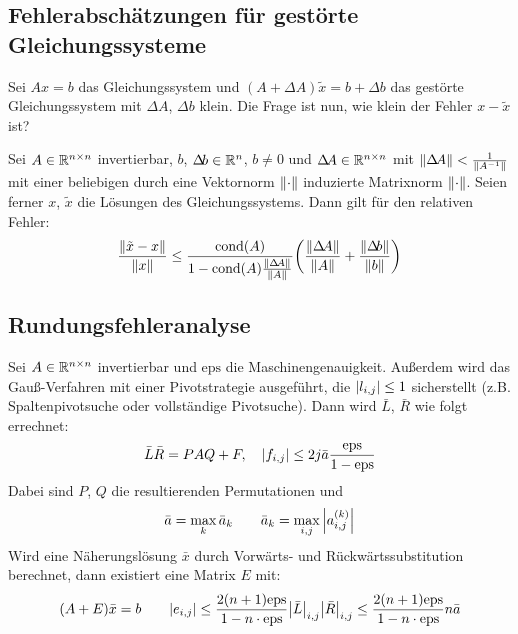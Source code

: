         \subsection{Fehlerabschätzungen für gestörte Gleichungssysteme}
            Sei \( Ax = b \) das Gleichungssystem und \( (A + \Delta\!A)\tilde{x} = b + \Delta\!b \) das gestörte Gleichungssystem mit \( \Delta\!A \), \( \Delta\!b \) klein. Die Frage ist nun, wie klein der Fehler \( x - \tilde{x} \) ist?
            
            Sei \( A \in \mathbb{R}^{n \times n} \) invertierbar, \(b\), \(\Delta\!b \in \mathbb{R}^n\), \(b \neq 0\) und \(\Delta\!A \in \mathbb{R}^{n \times n}\) mit \( \norm{\Delta\!A} < \frac{1}{\norm{A^{-1}}} \) mit einer beliebigen durch eine Vektornorm \( \norm{\cdot} \) induzierte Matrixnorm \( \norm{\cdot} \). Seien ferner \(x\), \(\tilde{x}\) die Lösungen des Gleichungssystems. Dann gilt für den relativen Fehler:
            \begin{equation*}
	            \frac{\norm{\tilde{x} - x}}{\norm{x}} \leq \frac{\operatorname{cond}(A)}{1 - \operatorname{cond}(A) \frac{\norm{\Delta\!A}}{\norm{A}}} \bigg( \frac{\norm{\Delta\!A}}{\norm{A}} + \frac{\norm{\Delta\!b}}{\norm{b}} \bigg)
            \end{equation*}

        \subsection{Rundungsfehleranalyse}
            Sei \( A \in \mathbb{R}^{n \times n} \) invertierbar und \( \textrm{eps} \) die Maschinengenauigkeit. Außerdem wird das Gauß-Verfahren mit einer Pivotstrategie ausgeführt, die \( \abs{l_{i,j}} \leq 1 \) sicherstellt (z.B. Spaltenpivotsuche oder vollständige Pivotsuche). Dann wird \( \bar{L} \), \( \bar{R} \) wie folgt errechnet:
            \begin{equation*}
	            \bar{L}\bar{R} = PAQ + F, \quad \abs{f_{i,j}} \leq 2 j \bar{a} \frac{\textrm{eps}}{1 - \textrm{eps}}
            \end{equation*}
            Dabei sind \(P\), \(Q\) die resultierenden Permutationen und
            \begin{equation*}
	            \bar{a} = \max_k \bar{a}_k \qquad \bar{a}_k = \max_{i,j} \abs{a_{i,j}^{(k)}}
            \end{equation*}
            Wird eine Näherungslösung \( \bar{x} \) durch Vorwärts- und Rückwärtssubstitution berechnet, dann existiert eine Matrix \(E\) mit:
            \begin{equation*}
	            (A + E) \bar{x} = b \qquad \abs{e_{i,j}} \leq \frac{2(n + 1) \textrm{eps}}{1 - n \cdot \textrm{eps}} \abs{\bar{L}}_{i,j} \abs{\bar{R}}_{i,j} \leq \frac{2(n + 1) \textrm{eps}}{1 - n \cdot \textrm{eps}} n \bar{a}
            \end{equation*}
            
